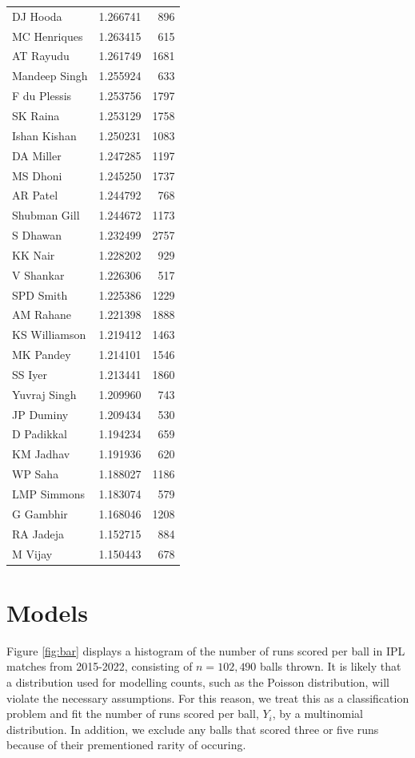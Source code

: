 \documentclass[
  12pt,
]{article}
\begin{document}
\begin{longtable}[]{@{}lrr@{}}
DJ Hooda & 1.266741 & 896 \\
MC Henriques & 1.263415 & 615 \\
AT Rayudu & 1.261749 & 1681 \\
Mandeep Singh & 1.255924 & 633 \\
F du Plessis & 1.253756 & 1797 \\
SK Raina & 1.253129 & 1758 \\
Ishan Kishan & 1.250231 & 1083 \\
DA Miller & 1.247285 & 1197 \\
MS Dhoni & 1.245250 & 1737 \\
AR Patel & 1.244792 & 768 \\
Shubman Gill & 1.244672 & 1173 \\
S Dhawan & 1.232499 & 2757 \\
KK Nair & 1.228202 & 929 \\
V Shankar & 1.226306 & 517 \\
SPD Smith & 1.225386 & 1229 \\
AM Rahane & 1.221398 & 1888 \\
KS Williamson & 1.219412 & 1463 \\
MK Pandey & 1.214101 & 1546 \\
SS Iyer & 1.213441 & 1860 \\
Yuvraj Singh & 1.209960 & 743 \\
JP Duminy & 1.209434 & 530 \\
D Padikkal & 1.194234 & 659 \\
KM Jadhav & 1.191936 & 620 \\
WP Saha & 1.188027 & 1186 \\
LMP Simmons & 1.183074 & 579 \\
G Gambhir & 1.168046 & 1208 \\
RA Jadeja & 1.152715 & 884 \\
M Vijay & 1.150443 & 678 \\
\end{longtable}

\hypertarget{sec:models}{%
\section{Models}\label{sec:models}}

Figure \ref{fig:bar} displays a histogram of the number of runs scored
per ball in IPL matches from 2015-2022, consisting of \(n = 102,490\)
balls thrown. It is likely that a distribution used for modelling
counts, such as the Poisson distribution, will violate the necessary
assumptions. For this reason, we treat this as a classification problem
and fit the number of runs scored per ball, \(Y_i\), by a multinomial
distribution. In addition, we exclude any balls that scored three or
five runs because of their prementioned rarity of occuring.
\end{document}

